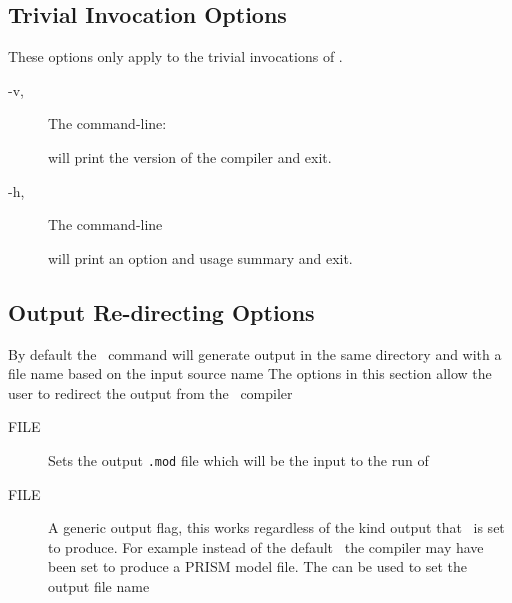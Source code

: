 \subsection{Trivial Invocation Options}
These options only apply to the trivial
invocations of \commandNameIpcSmc.

\begin{description}
\item[-v,  ]
%
The command-line:

will print the version of the \commandNameIpcSmc
compiler and exit.

\end{description}

\begin{description}
\item[-h,  ]
%
The command-line


will print an option and usage summary and exit.

\end{description}


\subsection{Output Re-directing Options}
By default the \commandNameIpcSmc\ command
will generate output in the same directory and
with a file name based on the input source name
The options in this section allow the user to
redirect the output from the
\commandNameIpcSmc\ compiler

\begin{description}
\item[ FILE]
Sets the output \texttt{.mod} file which will be
the input to the run of \hydra

\end{description}

\begin{description}
\item[ FILE]
A generic output flag, this works regardless of the kind
output that \commandNameIpcSmc\ is set to produce. For example
instead of the default \hydra\ the compiler may have
been set to produce a PRISM model file.
The  can be used to set the
output file name

\end{description}

